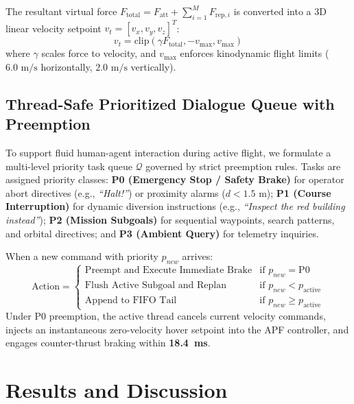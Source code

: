 \documentclass[conference]{IEEEtran}
\begin{document}
The resultant virtual force $F_{\text{total}} = F_{\text{att}} + \sum_{i=1}^M F_{\text{rep}, i}$ is converted into a 3D linear velocity setpoint $v_t = [v_x, v_y, v_z]^T$:
\begin{equation}
    v_t = \text{clip}\left( \gamma F_{\text{total}}, -v_{\max}, v_{\max} \right)
\end{equation}
where $\gamma$ scales force to velocity, and $v_{\max}$ enforces kinodynamic flight limits ($6.0\text{ m/s}$ horizontally, $2.0\text{ m/s}$ vertically).

\subsection{Thread-Safe Prioritized Dialogue Queue with Preemption}
To support fluid human-agent interaction during active flight, we formulate a multi-level priority task queue $\mathcal{Q}$ governed by strict preemption rules. Tasks are assigned priority classes: \textbf{P0 (Emergency Stop / Safety Brake)} for operator abort directives (e.g., \textit{``Halt!''}) or proximity alarms ($d < 1.5\text{ m}$); \textbf{P1 (Course Interruption)} for dynamic diversion instructions (e.g., \textit{``Inspect the red building instead''}); \textbf{P2 (Mission Subgoals)} for sequential waypoints, search patterns, and orbital directives; and \textbf{P3 (Ambient Query)} for telemetry inquiries.

When a new command with priority $p_{new}$ arrives:
\begin{equation}
    \text{Action} = \begin{cases}
        \text{Preempt and Execute Immediate Brake} & \text{if } p_{new} = \text{P0} \\
        \text{Flush Active Subgoal and Replan} & \text{if } p_{new} < p_{\text{active}} \\
        \text{Append to FIFO Tail} & \text{if } p_{new} \ge p_{\text{active}}
    \end{cases}
\end{equation}
Under P0 preemption, the active thread cancels current velocity commands, injects an instantaneous zero-velocity hover setpoint into the APF controller, and engages counter-thrust braking within \textbf{18.4~ms}.

\section{Results and Discussion}
\end{document}
